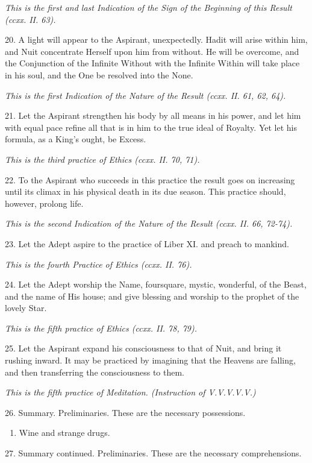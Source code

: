 \textit{This is the first and last Indication of the Sign of the Beginning of this Result (ccxx. II. 63).}

20. A light will appear to the Aspirant, unexpectedly. Hadit will arise within him, and Nuit concentrate Herself upon him from without. He will be overcome, and the Conjunction of the Infinite Without with the Infinite Within will take place in his soul, and the One be resolved into the None.

\textit{This is the first Indication of the Nature of the Result (ccxx. II. 61, 62, 64).}

21. Let the Aspirant strengthen his body by all means in his power, and let him with equal pace refine all that is in him to the true ideal of Royalty. Yet let his formula, as a King's ought, be Excess.

\textit{This is the third practice of Ethics (ccxx. II. 70, 71).}

22. To the Aspirant who succeeds in this practice the result goes on increasing until its climax in his physical death in its due season. This practice should, however, prolong life.

\textit{This is the second Indication of the Nature of the Result (ccxx. II. 66, 72-74).}

23. Let the Adept aspire to the practice of Liber XI. and preach to mankind.

\textit{This is the fourth Practice of Ethics (ccxx. II. 76).}

24. Let the Adept worship the Name, foursquare, mystic, wonderful, of the Beast, and the name of His house; and give blessing and worship to the prophet of the lovely Star.

\textit{This is the fifth practice of Ethics (ccxx. II. 78, 79).}

25. Let the Aspirant expand his consciousness to that of Nuit, and bring it rushing inward. It may be practiced by imagining that the Heavens are falling, and then transferring the consciousness to them.

\textit{This is the fifth practice of Meditation. (Instruction of V.V.V.V.V.)}

26. Summary. Preliminaries. These are the necessary possessions.
\begin{enumerate}[leftmargin=4\parindent]
\item Wine and strange drugs.
\end{enumerate}

27. Summary continued. Preliminaries. These are the necessary comprehensions.


